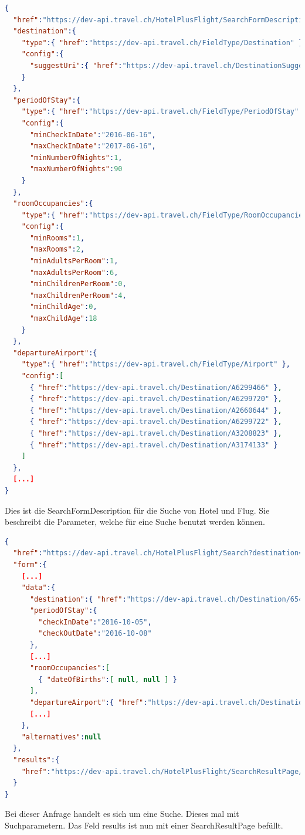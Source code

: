 \begin{lstlisting}[language=json,firstnumber=1]
{
  "href":"https://dev-api.travel.ch/HotelPlusFlight/SearchFormDescription/HotelPlusFligh",
  "destination":{
    "type":{ "href":"https://dev-api.travel.ch/FieldType/Destination" },
    "config":{
      "suggestUri":{ "href":"https://dev-api.travel.ch/DestinationSuggestions/HotelPlusFligh?q=%7B_%7D" }
    }
  },
  "periodOfStay":{
    "type":{ "href":"https://dev-api.travel.ch/FieldType/PeriodOfStay" },
    "config":{
      "minCheckInDate":"2016-06-16",
      "maxCheckInDate":"2017-06-16",
      "minNumberOfNights":1,
      "maxNumberOfNights":90
    }
  },
  "roomOccupancies":{
    "type":{ "href":"https://dev-api.travel.ch/FieldType/RoomOccupancies" },
    "config":{
      "minRooms":1,
      "maxRooms":2,
      "minAdultsPerRoom":1,
      "maxAdultsPerRoom":6,
      "minChildrenPerRoom":0,
      "maxChildrenPerRoom":4,
      "minChildAge":0,
      "maxChildAge":18
    }
  },
  "departureAirport":{
    "type":{ "href":"https://dev-api.travel.ch/FieldType/Airport" },
    "config":[
      { "href":"https://dev-api.travel.ch/Destination/A6299466" },
      { "href":"https://dev-api.travel.ch/Destination/A6299720" },
      { "href":"https://dev-api.travel.ch/Destination/A2660644" },
      { "href":"https://dev-api.travel.ch/Destination/A6299722" },
      { "href":"https://dev-api.travel.ch/Destination/A3208823" },
      { "href":"https://dev-api.travel.ch/Destination/A3174133" }
    ]
  },
  [...]
}
\end{lstlisting}
Dies ist die SearchFormDescription für die Suche von Hotel und Flug. Sie beschreibt die Parameter, welche für eine Suche benutzt werden können.

\begin{lstlisting}[language=json,firstnumber=1]
{
  "href":"https://dev-api.travel.ch/HotelPlusFlight/Search?destination=https%3A%2F%2Fdev-api.travel.ch%2FDestination%2F6547539&periodOfStay.checkInDate=2016-10-05&periodOfStay.checkOutDate=2016-10-08&[...]",
  "form":{
    [...]
    "data":{
      "destination":{ "href":"https://dev-api.travel.ch/Destination/6547539" },
      "periodOfStay":{
        "checkInDate":"2016-10-05",
        "checkOutDate":"2016-10-08"
      },
      [...]
      "roomOccupancies":[
        { "dateOfBirths":[ null, null ] }
      ],
      "departureAirport":{ "href":"https://dev-api.travel.ch/Destination/A6299722" },
      [...]
    },
    "alternatives":null
  },
  "results":{
    "href":"https://dev-api.travel.ch/HotelPlusFlight/SearchResultPage/19E2B6BB-1F06-4396-B86E-169EDB368B0E?hotelCategories%5B0%5D=https%3A%2F%2Fdev-api.travel.ch%2FHotelCategory%2FNone[...]"
  }
}
\end{lstlisting}
Bei dieser Anfrage handelt es sich um eine Suche. Dieses mal mit Suchparametern. Das Feld results ist nun mit einer SearchResultPage befüllt.

